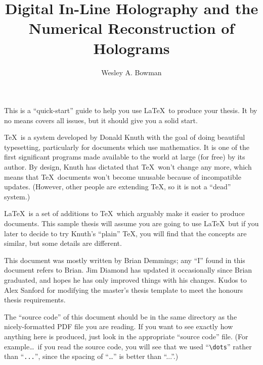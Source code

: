 

\title{Digital In-Line Holography and the Numerical Reconstruction of Holograms}
\author{Wesley A. Bowman}
\tablespagefalse

\beforepreface
{}

This is a ``quick-start'' guide to help you use \LaTeX\ to produce
your thesis.  It by no means covers all issues, but it should give you
a solid start.

\TeX\ is a system developed by Donald Knuth with the goal of doing
beautiful typesetting, particularly for documents which use
mathematics.  It is one of the first significant programs made
available to the world at large (for free) by its author.  By design,
Knuth has dictated that \TeX\ won't change any more, which means
that \TeX\ documents won't become unusable because of incompatible
updates.  (However, other people are extending \TeX, so it is not a
``dead'' system.)

\LaTeX\ is a set of additions to \TeX\ which arguably make it easier
to produce documents.  This sample thesis will assume you are going to
use \LaTeX\, but if you later to decide to try Knuth's ``plain'' \TeX,
you will find that the concepts are similar, but some details are
different.

This document was mostly written by Brian Demmings; any ``I'' found in
this document refers to Brian.  Jim Diamond has updated it
occasionally since Brian graduated, and hopes he has only improved
things with his changes.  Kudos to Alex Sanford for modifying the
master's thesis template to meet the honours thesis requirements.

The ``source code'' of this document should be in the same directory
as the nicely-formatted PDF file you are reading.  If you want to see
exactly how anything here is produced, just look in the appropriate
``source code'' file.  (For example\dots\ if you read the source code,
you will see that we used ``\verb|\dots|'' rather than ``\verb|...|'',
since the spacing of ``\dots'' is better than ``...''.)

